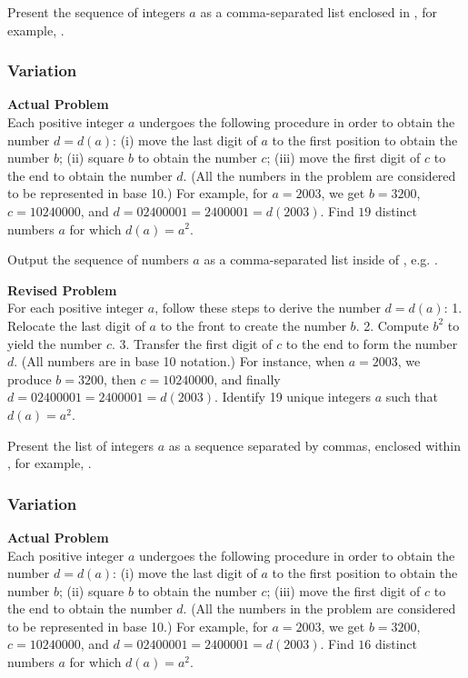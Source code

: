 Present the sequence of integers \( a \) as a comma-separated list enclosed in \boxed, for example, .

\subsubsection{Variation}
\textbf{Actual Problem}\\
Each positive integer $a$ undergoes the following procedure in order to obtain the number $d = d(a)$:
(i) move the last digit of $a$ to the first position to obtain the number $b$;
(ii) square $b$ to obtain the number $c$;
(iii) move the first digit of $c$ to the end to obtain the number $d$.
(All the numbers in the problem are considered to be represented in base 10.) 
For example, for $a = 2003$, we get $b = 3200$, $c = 10240000$, and $d = 02400001 = 2400001 = d(2003)$.
Find $19$ distinct numbers $a$ for which $d(a) = a^2$.


Output the sequence of numbers $a$ as a comma-separated list inside of \boxed, e.g. .

\textbf{Revised Problem}\\
For each positive integer $a$, follow these steps to derive the number $d = d(a)$:
1. Relocate the last digit of $a$ to the front to create the number $b$.
2. Compute $b^2$ to yield the number $c$.
3. Transfer the first digit of $c$ to the end to form the number $d$.
(All numbers are in base 10 notation.) 
For instance, when $a = 2003$, we produce $b = 3200$, then $c = 10240000$, and finally $d = 02400001 = 2400001 = d(2003)$.
Identify 19 unique integers $a$ such that $d(a) = a^2$.

Present the list of integers $a$ as a sequence separated by commas, enclosed within \boxed, for example, .

\subsubsection{Variation}
\textbf{Actual Problem}\\
Each positive integer $a$ undergoes the following procedure in order to obtain the number $d = d(a)$:
(i) move the last digit of $a$ to the first position to obtain the number $b$;
(ii) square $b$ to obtain the number $c$;
(iii) move the first digit of $c$ to the end to obtain the number $d$.
(All the numbers in the problem are considered to be represented in base 10.) 
For example, for $a = 2003$, we get $b = 3200$, $c = 10240000$, and $d = 02400001 = 2400001 = d(2003)$.
Find $16$ distinct numbers $a$ for which $d(a) = a^2$.


